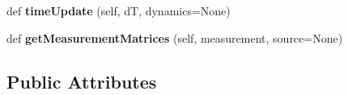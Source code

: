 \begin{DoxyCompactItemize}
\item 
def {\bfseries time\+Update} (self, dT, dynamics=None)\hypertarget{classSignalCorrelationSubstate_1_1CorrelationFilter_a07a8c37a30c3d0a057049e0ff2eac67f}{}\label{classSignalCorrelationSubstate_1_1CorrelationFilter_a07a8c37a30c3d0a057049e0ff2eac67f}

\item 
def {\bfseries get\+Measurement\+Matrices} (self, measurement, source=None)\hypertarget{classSignalCorrelationSubstate_1_1CorrelationFilter_ae7338456be781e322eba5bce4e41199f}{}\label{classSignalCorrelationSubstate_1_1CorrelationFilter_ae7338456be781e322eba5bce4e41199f}

\end{DoxyCompactItemize}
\subsection*{Public Attributes}
